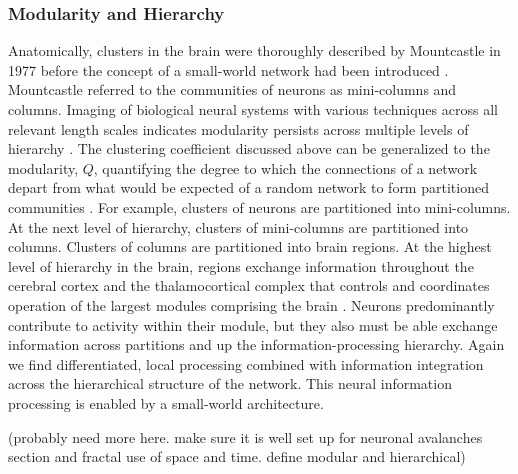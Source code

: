 \subsubsection{\label{sec:modularity_and_hierarchy}Modularity and Hierarchy}
Anatomically, clusters in the brain were thoroughly described by Mountcastle in 1977 \cite{mo1978} before the concept of a small-world network had been introduced \cite{wast1998}. Mountcastle referred to the communities of neurons as mini-columns and columns. Imaging of biological neural systems with various techniques across all relevant length scales indicates modularity persists across multiple levels of hierarchy \cite{beba2017}. The clustering coefficient discussed above can be generalized to the modularity, $Q$, quantifying the degree to which the connections of a network depart from what would be expected of a random network to form partitioned communities \cite{rusp2010,beba2017}. For example, clusters of neurons are partitioned into mini-columns. At the next level of hierarchy, clusters of mini-columns are partitioned into columns. Clusters of columns are partitioned into brain regions. At the highest level of hierarchy in the brain, regions exchange information throughout the cerebral cortex and the thalamocortical complex that controls and coordinates operation of the largest modules comprising the brain \cite{bosp2015}. Neurons predominantly contribute to activity within their module, but they also must be able exchange information across partitions and up the information-processing hierarchy. Again we find differentiated, local processing combined with information integration across the hierarchical structure of the network. This neural information processing is enabled by a small-world architecture.



(probably need more here. make sure it is well set up for neuronal avalanches section and fractal use of space and time. define modular and hierarchical)

